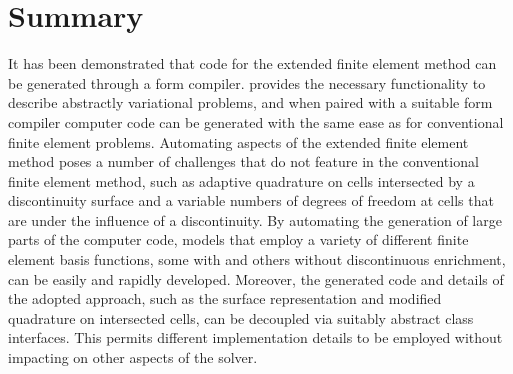 \section{Summary}

It has been demonstrated that code for the extended finite element method
can be generated through a form compiler. \ufl{} provides the necessary
functionality to describe abstractly variational problems, and when paired
with a suitable form compiler computer code can be generated with the same
ease as for conventional finite element problems.  Automating aspects of
the extended finite element method poses a number of challenges that do
not feature in the conventional finite element method, such as adaptive
quadrature on cells intersected by a discontinuity surface and a variable
numbers of degrees of freedom at cells that are under the influence
of a discontinuity. By automating the generation of large parts of the
computer code, models that employ a variety of different finite element
basis functions, some with and others without discontinuous enrichment,
can be easily and rapidly developed.  Moreover, the generated code and
details of the adopted approach, such as the surface representation and
modified quadrature on intersected cells, can be decoupled via suitably
abstract class interfaces. This permits different implementation details
to be employed without impacting on other aspects of the solver.
